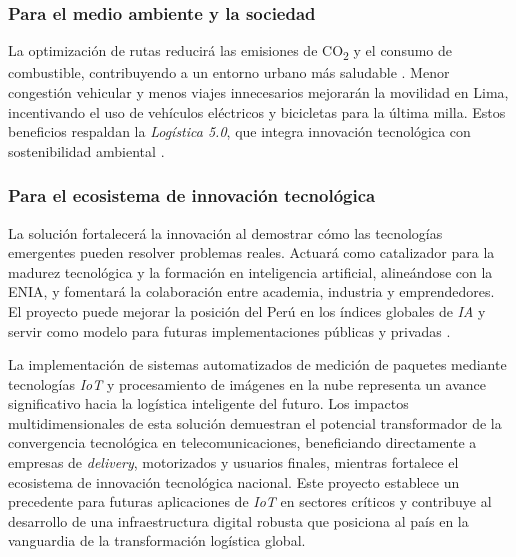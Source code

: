 \subsubsection{Para el medio ambiente y la sociedad}

La optimización de rutas reducirá las emisiones de CO\textsubscript{2} y el consumo de combustible, contribuyendo a un entorno urbano más saludable \cite{WebRef13249}. Menor congestión vehicular y menos viajes innecesarios mejorarán la movilidad en Lima, incentivando el uso de vehículos eléctricos y bicicletas para la última milla. Estos beneficios respaldan la \textit{Logística 5.0}, que integra innovación tecnológica con sostenibilidad ambiental \cite{WebRef132362}.

\subsubsection{Para el ecosistema de innovación tecnológica}

La solución fortalecerá la innovación al demostrar cómo las tecnologías emergentes pueden resolver problemas reales. Actuará como catalizador para la madurez tecnológica y la formación en inteligencia artificial, alineándose con la ENIA, y fomentará la colaboración entre academia, industria y emprendedores. El proyecto puede mejorar la posición del Perú en los índices globales de \textit{IA} y servir como modelo para futuras implementaciones públicas y privadas \cite{ArticleRef255132}.

\vspace{1em}

La implementación de sistemas automatizados de medición de paquetes mediante tecnologías \textit{IoT} y procesamiento de imágenes en la nube representa un avance significativo hacia la logística inteligente del futuro. Los impactos multidimensionales de esta solución demuestran el potencial transformador de la convergencia tecnológica en telecomunicaciones, beneficiando directamente a empresas de \textit{delivery}, motorizados y usuarios finales, mientras fortalece el ecosistema de innovación tecnológica nacional. Este proyecto establece un precedente para futuras aplicaciones de \textit{IoT} en sectores críticos y contribuye al desarrollo de una infraestructura digital robusta que posiciona al país en la vanguardia de la transformación logística global.

